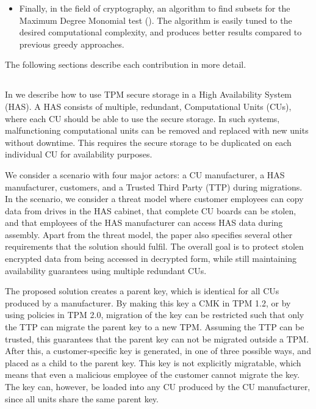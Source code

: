 \begin{itemize}
  \item Finally, in the field of cryptography, an algorithm to find subsets for the Maximum Degree Monomial test ().
  The algorithm is easily tuned to the desired computational complexity, and produces better results compared to previous greedy approaches.
  
\end{itemize}
The following sections describe each contribution in more detail.

\subsection{\paperItitle}

In  we describe how to use TPM secure storage in a High Availability System (HAS).
A HAS consists of multiple, redundant, Computational Units (CUs), where each CU should be able to use the secure storage.
In such systems, malfunctioning computational units can be removed and replaced with new units without downtime.
This requires the secure storage to be duplicated on each individual CU for availability purposes.

We consider a scenario with four major actors: a CU manufacturer, a HAS manufacturer, customers, and a Trusted Third Party (TTP) during migrations.
In the scenario, we consider a threat model where customer employees can copy data from drives in the HAS cabinet, that complete CU boards can be stolen, and that employees of the HAS manufacturer can access HAS data during assembly.
Apart from the threat model, the paper also specifies several other requirements that the solution should fulfil.
The overall goal is to protect stolen encrypted data from being accessed in decrypted form, while still maintaining availability guarantees using multiple redundant CUs.

The proposed solution creates a parent key, which is identical for all CUs produced by a manufacturer.
By making this key a CMK in TPM 1.2, or by using policies in TPM 2.0, migration of the key can be restricted such that only the TTP can migrate the parent key to a new TPM.
Assuming the TTP can be trusted, this guarantees that the parent key can not be migrated outside a TPM.
After this, a customer-specific key is generated, in one of three possible ways, and placed as a child to the parent key.
This key is not explicitly migratable, which means that even a malicious employee of the customer cannot migrate the key.
The key can, however, be loaded into any CU produced by the CU manufacturer, since all units share the same parent key.

